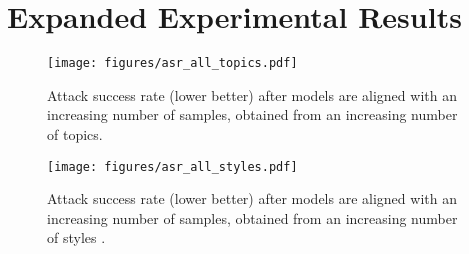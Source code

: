 \section{Expanded Experimental Results}\label{app:experiments_extra}


\begin{figure}[ht]
  \centering
  \texttt{[image: figures/asr\_all\_topics.pdf]}
  \caption{Attack success rate (lower better) after models are aligned with an increasing number of samples, obtained from an increasing number of topics.}\label{fig:topics_sizes_full}
\end{figure}

\begin{figure}[ht]
  \centering
  \texttt{[image: figures/asr\_all\_styles.pdf]}
  \caption{Attack success rate (lower better) after models are aligned with an increasing number of samples, obtained from an increasing number of styles .}\label{fig:styles_sizes_full}
\end{figure}

